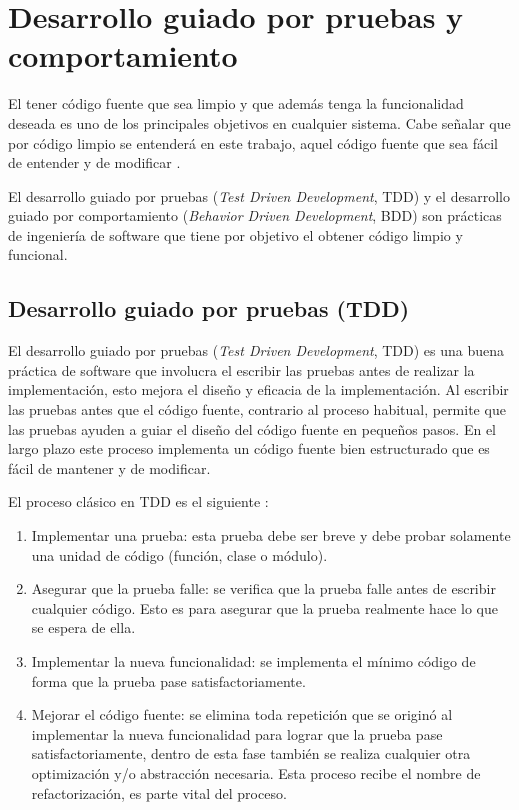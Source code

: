 \section{Desarrollo guiado por pruebas y comportamiento}
El tener código fuente que sea limpio y que además tenga la funcionalidad deseada
es uno de los principales objetivos en cualquier sistema. Cabe señalar que
por código limpio se entenderá en este trabajo, aquel código fuente que sea fácil
de entender y de modificar \cite{4_beck_2003}.

El desarrollo guiado por pruebas (\textit{Test Driven Development}, TDD) y el
desarrollo guiado por comportamiento (\textit{Behavior Driven Development}, BDD)
son prácticas de ingeniería de software que tiene por objetivo el obtener código
limpio y funcional.

\subsection{Desarrollo guiado por pruebas (TDD)}
El desarrollo guiado por pruebas (\textit{Test Driven Development}, TDD) es una
buena práctica de software que involucra el escribir las pruebas antes de
realizar la implementación, esto mejora el diseño y eficacia de la implementación.
Al escribir las pruebas antes que el código fuente, contrario al proceso habitual,
permite que las pruebas ayuden a guiar el diseño del código fuente en pequeños
pasos. En el largo plazo este proceso implementa un código fuente bien
estructurado que es fácil de mantener y de modificar\cite{4_beck_2003}.

\vspace{2.5mm}

El proceso clásico en TDD es el siguiente \cite{12_rappin_2010}:
\begin{enumerate}
\item Implementar una prueba: esta prueba debe ser breve y debe probar
  solamente una unidad de código (función, clase o módulo).
\item Asegurar que la prueba falle: se verifica que la prueba falle antes
  de escribir cualquier código. Esto es para asegurar que la prueba realmente
  hace lo que se espera de ella.
\item Implementar la nueva funcionalidad: se implementa el mínimo código de
  forma que la prueba pase satisfactoriamente.
\item Mejorar el código fuente: se elimina toda repetición que se originó al
  implementar la nueva funcionalidad para lograr que la prueba pase
  satisfactoriamente, dentro de esta fase también se realiza cualquier
  otra optimización y/o abstracción necesaria. Esta proceso recibe el nombre de
  refactorización, es parte vital del proceso.
\end{enumerate}

